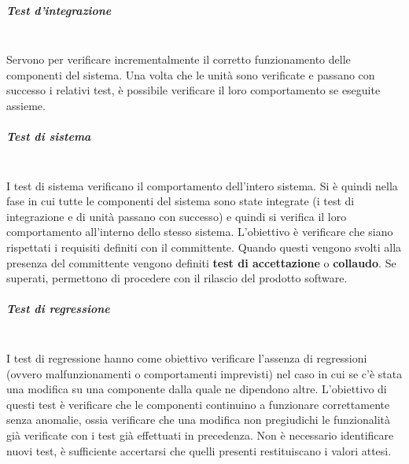 \subparagraph{Test d’integrazione} \mbox{}\\
Servono per verificare incrementalmente il corretto funzionamento delle componenti del sistema.
Una volta che le unità sono verificate e passano con successo i relativi test, è possibile verificare il loro comportamento se eseguite assieme.

\subparagraph{Test di sistema} \mbox{}\\
I test di sistema verificano il comportamento dell’intero sistema.
Si è quindi nella fase in cui tutte le componenti del sistema sono state integrate (i test di integrazione e di unità passano con successo) e quindi si verifica il loro comportamento all’interno dello stesso sistema.
L'obiettivo è verificare che siano rispettati i requisiti definiti con il committente.
Quando questi vengono svolti alla presenza del committente vengono definiti \textbf{test di accettazione} o \textbf{collaudo}. Se superati, permettono di procedere con il rilascio del prodotto software.

\subparagraph{Test di regressione} \mbox{}\\
I test di regressione hanno come obiettivo verificare l'assenza di regressioni (ovvero malfunzionamenti o comportamenti imprevisti) nel caso in cui se c’è stata una modifica su una componente dalla quale ne dipendono altre.
L'obiettivo di questi test è verificare che le componenti continuino a funzionare correttamente senza anomalie, ossia verificare che una modifica non pregiudichi le funzionalità già verificate con i test già effettuati in precedenza.
Non è necessario identificare nuovi test, è sufficiente accertarsi che quelli presenti restituiscano i valori attesi.

